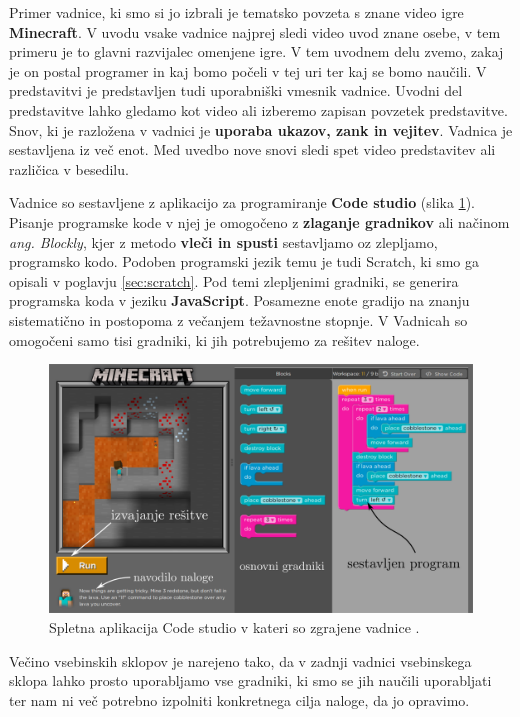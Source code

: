 
Primer vadnice, ki smo si jo izbrali je tematsko povzeta s znane video
igre \textbf{Minecraft}. V uvodu vsake vadnice najprej sledi video
uvod znane osebe, v tem primeru je to glavni razvijalec omenjene
igre. V tem uvodnem delu zvemo, zakaj je on postal programer in kaj
bomo počeli v tej uri ter kaj se bomo naučili. V predstavitvi je
predstavljen tudi uporabniški vmesnik vadnice. Uvodni del predstavitve
lahko gledamo kot video ali izberemo zapisan povzetek
predstavitve. Snov, ki je razložena v vadnici je \textbf{uporaba
  ukazov, zank in vejitev}. Vadnica je sestavljena iz več enot. Med
uvedbo nove snovi sledi spet video predstavitev ali različica v
besedilu.

Vadnice so sestavljene z aplikacijo za programiranje \textbf{Code
  studio} (slika \ref{fig:scr:web:codestudio}). Pisanje programske
kode v njej je omogočeno z \textbf{zlaganje gradnikov} ali načinom
\emph{ang. Blockly}, kjer z metodo \textbf{vleči in spusti}
sestavljamo oz zlepljamo, programsko kodo. Podoben programski jezik
temu je tudi Scratch, ki smo ga opisali v poglavju
\ref{sec:scratch}. Pod temi zlepljenimi gradniki, se generira
programska koda v jeziku \textbf{JavaScript}. Posamezne enote gradijo
na znanju sistematično in postopoma z večanjem težavnostne stopnje. V
Vadnicah so omogočeni samo tisi gradniki, ki jih potrebujemo za
rešitev naloge.

\begin{figure}[h!]
  \centering
    \includegraphics [width=0.65\linewidth, keepaspectratio =
    1] {./images/sc_web/code_cstudiov01.png}
    \caption{Spletna aplikacija Code studio v kateri so zgrajene
      vadnice \cite{web:code.org}.}
    \label{fig:scr:web:codestudio}
\end{figure}

Večino vsebinskih sklopov je narejeno tako, da v zadnji vadnici
vsebinskega sklopa lahko prosto uporabljamo vse gradniki, ki smo se
jih naučili uporabljati ter nam ni več potrebno izpolniti konkretnega
cilja naloge, da jo opravimo.

